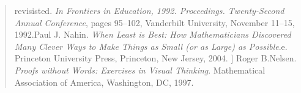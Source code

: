 \documentclass[a4paper,fleqn]{book}
\begin{document}
\begin{quote}
revisisted. \emph{In Frontiers in Education, 1992. Proceedings. Twenty-Second Annual
Conference},  pages 95–102, Vanderbilt University, November 11–15, 1992.\newline\newline
[30] Paul J. Nahin. \emph{When Least is Best: How Mathematicians Discovered Many Clever
Ways to Make Things as Small (or as Large) as Possible}.e. Princeton University Press,
Princeton, New Jersey, 2004.\newline\newline
[31]\; ] Roger B.Nelsen. \emph{Proofs without Words: Exercises in Visual Thinking}. Mathematical
Association of America, Washington, DC, 1997.



\end{quote}
\end{document}
